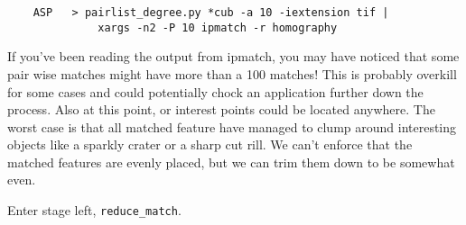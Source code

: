 \begin{verbatim}
    ASP   > pairlist_degree.py *cub -a 10 -iextension tif |
              xargs -n2 -P 10 ipmatch -r homography
\end{verbatim}

If you've been reading the output from ipmatch, you may have noticed
that some pair wise matches might have more than a 100 matches! This
is probably overkill for some cases and could potentially chock an
application further down the process. Also at this point, or interest
points could be located anywhere. The worst case is that all matched
feature have managed to clump around interesting objects like a
sparkly crater or a sharp cut rill. We can't enforce that the matched
features are evenly placed, but we can trim them down to be somewhat
even.

Enter stage left, \texttt{reduce\_match}.
